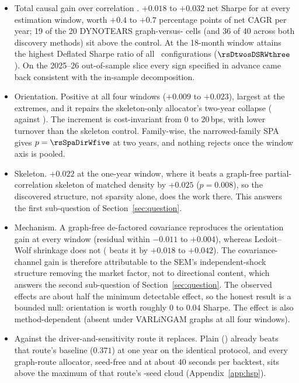 \begin{itemize}[itemsep=2pt, topsep=3pt]
  \item Total causal gain over correlation \HRP{}. $+0.018$ to
    $+0.032$ net Sharpe for \skelsem{} at every estimation window, worth
    $+0.4$ to $+0.7$ percentage points of net CAGR per year; 19 of the 20
    DYNOTEARS graph-versus-\HRP{} cells (and 36 of 40 across both
    discovery methods) sit above the control. At the 18-month window
    \orientsem{} attains the highest Deflated Sharpe ratio of all
    \rsNtrials\ configurations ($\rsDtwosDSRWthree$). On the 2025--26
    out-of-sample slice every sign specified in advance came back
    consistent with the in-sample decomposition.
  \item Orientation. Positive at all four windows ($+0.009$ to
    $+0.023$), largest at the extremes, and it repairs the skeleton-only
    allocator's two-year collapse (\rsDoneSharpeWfive{} against
    \rsDzeroSharpeWfive{}). The increment is cost-invariant from 0 to
    20\,bps, with lower turnover than the skeleton control. Family-wise,
    the narrowed-family SPA gives $p=\rsSpaDirWfive$ at two years, and
    nothing rejects once the window axis is pooled.
  \item Skeleton. $+0.022$ at the one-year window, where it beats
    a graph-free partial-correlation skeleton of matched density by
    $+0.025$ ($p=0.008$), so the discovered structure, not sparsity
    alone, does the work there. This answers the first sub-question of
    Section~\ref{sec:question}.
  \item Mechanism. A graph-free de-factored covariance reproduces
    the orientation gain at every window (residual within $-0.011$ to
    $+0.004$), whereas Ledoit--Wolf shrinkage does not (\skelsem{} beats
    it by $+0.018$ to $+0.042$). The covariance-channel gain is therefore
    attributable to the SEM's independent-shock structure removing the
    market factor, not to directional content, which answers the second
    sub-question of Section~\ref{sec:question}. The observed effects are
    about half the minimum detectable effect, so the honest result is a
    bounded null: orientation is worth roughly $0$ to $0.04$ Sharpe. The
    effect is also method-dependent (absent under VARLiNGAM graphs at all
    four windows).
  \item Against the driver-and-sensitivity route it replaces.
    Plain \HRP{} (\rsCorrSharpe) already beats that route's baseline
    ($0.371$) at one year on the identical protocol, and every graph-route
    allocator, seed-free and at about 40 seconds per backtest, sits above
    the maximum of that route's \rsSeedN-seed cloud
    (Appendix~\ref{app:hsp}).
\end{itemize}

